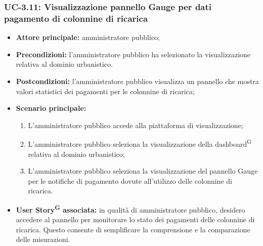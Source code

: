 \documentclass[8pt]{article}
\newcommand{\glossterm}[1]{#1\textsuperscript{G}} %
\begin{document}
\subsubsection*{UC-3.11: Visualizzazione pannello Gauge per dati pagamento di colonnine di ricarica}
\begin{itemize}
    \item \textbf{Attore principale:} amministratore pubblico;
    \item \textbf{Precondizioni:} l’amministratore pubblico ha selezionato la visualizzazione
        relativa al dominio urbanistico.
    \item \textbf{Postcondizioni:} l'amministratore pubblico visualizza un pannello che mostra valori statistici dei pagamenti per le colonnine di ricarica;
    \item \textbf{Scenario principale:} 
    \begin{enumerate}
    \item L’amministratore pubblico accede alla piattaforma di visualizzazione;
    \item L’amministratore pubblico seleziona la visualizzazione della \glossterm{dashboard} relativa al dominio urbanistico;
    \item L’amministratore pubblico seleziona la visualizzazione del pannello Gauge per le
        notifiche di pagamento dovute all'utilizzo delle colonnine di ricarica.
    \end{enumerate}
    \item \textbf{\glossterm{User Story} associata:} in qualità di amministratore pubblico, desidero accedere al
        pannello per monitorare lo stato dei pagamenti delle colonnine di ricarica. Questo consente di semplificare la comprensione e la comparazione delle misurazioni.
\end{itemize}
\end{document}
